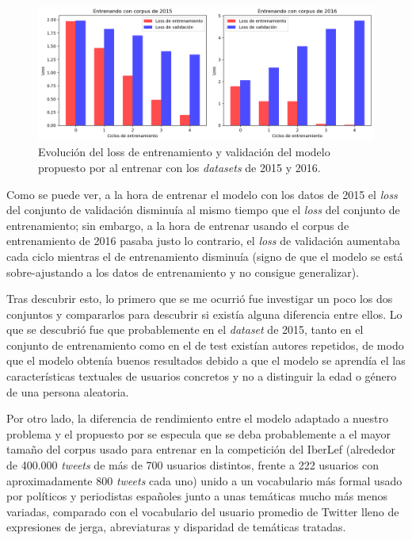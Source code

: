  \begin{figure}[H]
    \centering
    \includegraphics[width=\textwidth]{imaxes/loss.png}
    \caption{Evolución del loss de entrenamiento y validación del modelo propuesto por \citet{loscalis22} al entrenar con los \textit{datasets} de 2015 y 2016.}
    \label{fig:loss}
\end{figure}

Como se puede ver, a la hora de entrenar el modelo con los datos de 2015 el \textit{loss} del conjunto de validación disminuía al mismo tiempo que el \textit{loss} del conjunto de entrenamiento; sin embargo, a la hora de entrenar usando el corpus de entrenamiento de 2016 pasaba justo lo contrario, el \textit{loss} de validación aumentaba cada ciclo mientras el de entrenamiento disminuía (signo de que el modelo se está sobre-ajustando a los datos de entrenamiento y no consigue generalizar).

 Tras descubrir esto, lo primero que se me ocurrió fue investigar un poco los dos conjuntos y compararlos para descubrir si existía alguna diferencia entre ellos. Lo que se descubrió fue que probablemente en el \textit{dataset} de 2015, tanto en el conjunto de entrenamiento como en el de test existían autores repetidos, de modo que el modelo obtenía buenos resultados debido a que el modelo se aprendía el las características textuales de usuarios concretos y no a distinguir la edad o género de una persona aleatoria.
 
 Por otro lado, la diferencia de rendimiento entre el modelo adaptado a nuestro problema y el propuesto por \citet{loscalis22} se especula que se deba probablemente a el mayor tamaño del corpus usado para entrenar en la competición del IberLef (alrededor de 400.000 \textit{tweets} de más de 700 usuarios distintos, frente a 222 usuarios con aproximadamente 800 \textit{tweets} cada uno) unido a un vocabulario más formal usado por políticos y periodistas españoles junto a unas temáticas mucho más menos variadas, comparado con el vocabulario del usuario promedio de Twitter lleno de expresiones de jerga, abreviaturas y disparidad de temáticas tratadas.
 
